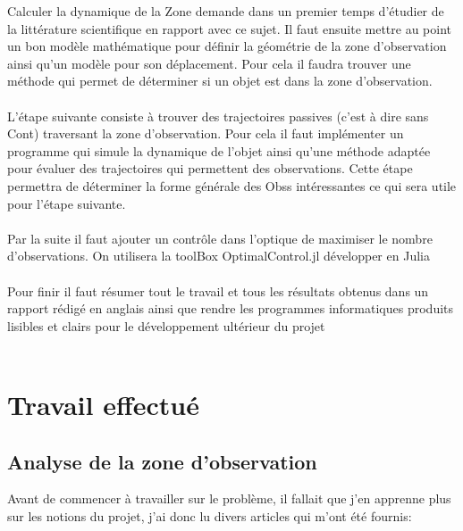 \documentclass[11pt]{article} %
\begin{document}
		Calculer la dynamique de la \gls{Zone} demande dans un premier temps d'étudier de la littérature scientifique en rapport avec ce sujet. Il faut ensuite mettre au point un bon modèle mathématique pour définir la géométrie de la zone d'observation ainsi qu'un modèle pour son déplacement. Pour cela il faudra trouver une méthode qui permet de déterminer si un objet est dans la zone d'observation.
		\\ \\
		L'étape suivante consiste à trouver des trajectoires passives (c'est à dire sans \gls{Cont}) traversant la zone d'observation. Pour cela il faut implémenter un programme qui simule la dynamique de l'objet ainsi qu'une méthode adaptée pour évaluer des trajectoires qui permettent des observations. Cette étape permettra de déterminer la forme générale  des \glspl{Obs} intéressantes ce qui sera utile pour l'étape suivante.
		\\ \\
		Par la suite il faut ajouter un contrôle dans l'optique de maximiser le nombre d'observations. On utilisera la toolBox OptimalControl.jl développer en Julia
		\\ \\
		Pour finir il faut résumer tout le travail et tous les résultats obtenus dans un rapport rédigé en anglais ainsi que rendre les programmes informatiques produits lisibles et clairs pour le développement ultérieur du projet
		\\ \\
		
		\section{Travail effectué}
		
		\subsection{Analyse de la zone d'observation}
		Avant de commencer à travailler sur le problème, il fallait que j'en apprenne plus sur les notions du projet, j'ai donc lu divers articles qui m'ont été fournis:
		
\end{document}
